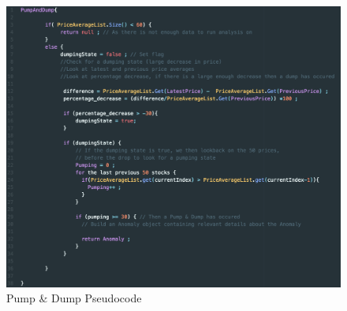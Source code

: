 \documentclass[12pt]{article}
\begin{document}
    \begin{figure}[H]
    \centering
    \includegraphics[width=150mm]{PDpseudo.png}
    \caption{Pump \& Dump Pseudocode}
    \end{figure}
\end{document}
